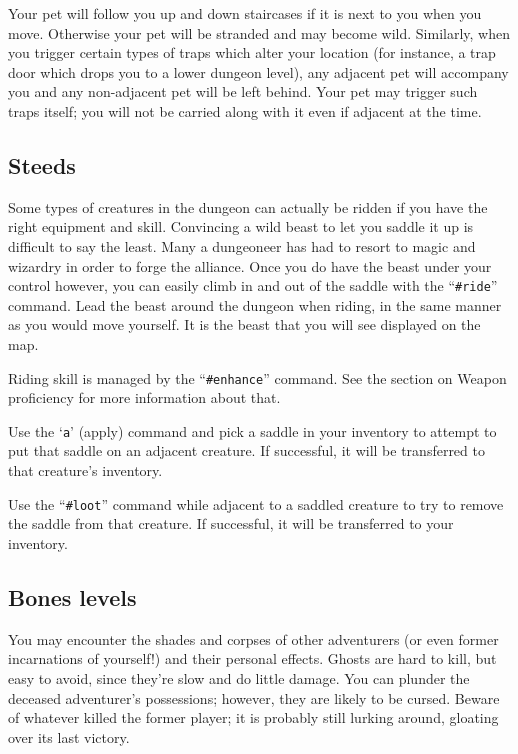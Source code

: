 Your pet will follow you up and down staircases if it is next to you
when you move.  Otherwise your pet will be stranded and may become
wild.  Similarly, when you trigger certain types of traps which alter
your location (for instance, a trap door which drops you to a lower
dungeon level), any adjacent pet will accompany you and any non-adjacent
pet will be left behind.  Your pet may trigger such traps itself; you
will not be carried along with it even if adjacent at the time.

\subsection*{Steeds}

Some types of creatures in the dungeon can actually be ridden if you
have the right equipment and skill.  Convincing a wild beast to let
you saddle it up is difficult to say the least.  Many a dungeoneer
has had to resort to magic and wizardry in order to forge the alliance.
Once you do have the beast under your control however, you can
easily climb in and out of the saddle with the ``{\tt \#ride}'' command.  Lead
the beast around the dungeon when riding, in the same manner as
you would move yourself.  It is the beast that you will see displayed
on the map.

Riding skill is managed by the ``{\tt \#enhance}'' command.  See the section
on Weapon proficiency for more information about that.

Use the `{\tt a}' (apply) command and pick a saddle in your inventory to
attempt to put that saddle on an adjacent creature.  If successful,
it will be transferred to that creature's inventory.

Use the ``{\tt \#loot}'' command while adjacent to a saddled creature to
try to remove the saddle from that creature.  If successful, it will
be transferred to your inventory.

\subsection*{Bones levels}

You may encounter the shades and corpses of other adventurers (or even
former incarnations of yourself!) and their personal effects.  Ghosts
are hard to kill, but easy to avoid, since they're slow and do little
damage.  You can plunder the deceased adventurer's possessions;
however, they are likely to be cursed.  Beware of whatever killed the
former player; it is probably still lurking around, gloating over its
last victory.

